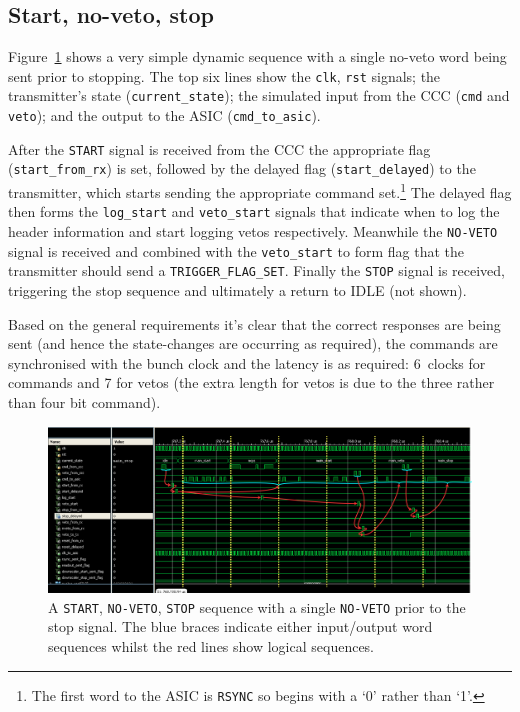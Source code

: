 \subsection{Start, no-veto, stop} %
\label{sec:start_no_veto_stop}
Figure~\ref{fig:isim_start-veto-stop} shows a very simple dynamic sequence with a single no-veto word being sent prior to stopping. The top six lines show the \texttt{clk}, \texttt{rst} signals; the transmitter's state (\texttt{current\_state}); the simulated input from the CCC (\texttt{cmd} and \texttt{veto}); and the output to the ASIC (\texttt{cmd\_to\_asic}).

After the \texttt{START} signal is received from the CCC the appropriate flag (\texttt{start\_from\_rx}) is set, followed by the delayed flag (\texttt{start\_delayed}) to the transmitter, which starts sending the appropriate command set.\footnote{The first word to the ASIC is \texttt{RSYNC} so begins with a `0' rather than `1'.} The delayed flag then forms the \texttt{log\_start} and \texttt{veto\_start} signals that indicate when to log the header information and start logging vetos respectively. Meanwhile the \texttt{NO-VETO} signal is received and combined with the \texttt{veto\_start} to form flag that the transmitter should send a \texttt{TRIGGER\_FLAG\_SET}. Finally the \texttt{STOP} signal is received, triggering the stop sequence and ultimately a return to IDLE (not shown).

Based on the general requirements it's clear that the correct responses are being sent (and hence the state-changes are occurring as required), the commands are synchronised with the bunch clock and the latency is as required: 6~clocks for commands and 7 for vetos (the extra length for vetos is due to the three rather than four bit command).

\begin{figure}
    \centering
    \includegraphics[width=\textwidth]{images/isim/edited/start-veto-stop.png}
    \caption{A \texttt{START}, \texttt{NO-VETO}, \texttt{STOP} sequence with a single \texttt{NO-VETO} prior to the stop signal. The blue braces indicate either input/output word sequences whilst the red lines show logical sequences.}
    \label{fig:isim_start-veto-stop}
\end{figure}

